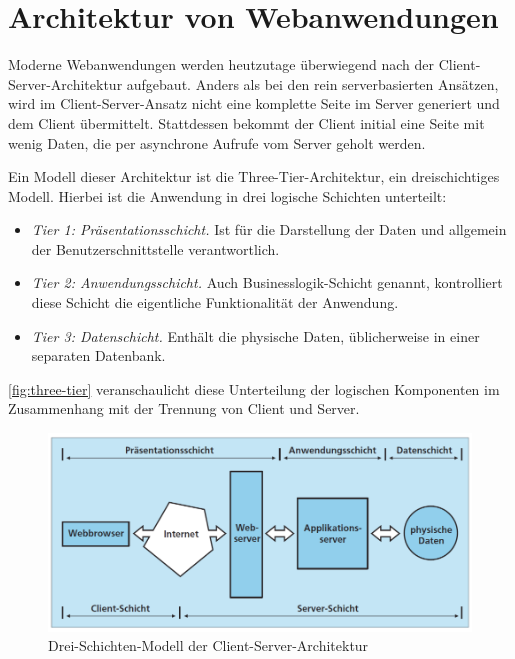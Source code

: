 \section{Architektur von Webanwendungen}
Moderne Webanwendungen werden heutzutage überwiegend nach der Client-Server-Architektur aufgebaut. Anders als bei den rein serverbasierten Ansätzen, wird im Client-Server-Ansatz nicht eine komplette Seite im Server generiert und dem Client übermittelt. Stattdessen bekommt der Client initial eine Seite mit wenig Daten, die per asynchrone Aufrufe vom Server geholt werden\cite{Saternos2014}.

Ein Modell dieser Architektur ist die Three-Tier-Architektur, ein dreischichtiges Modell. Hierbei ist die Anwendung in drei logische Schichten unterteilt\cite{Techopedia2017}:
\begin{itemize}
	\item \textit{Tier 1: Präsentationsschicht.} Ist für die Darstellung der Daten und allgemein der Benutzerschnittstelle verantwortlich.
	\item \textit{Tier 2: Anwendungsschicht.} Auch Businesslogik-Schicht genannt, kontrolliert diese Schicht die eigentliche Funktionalität der Anwendung.
	\item \textit{Tier 3: Datenschicht.} Enthält die physische Daten, üblicherweise in einer separaten Datenbank.
\end{itemize}

\autoref{fig:three-tier} veranschaulicht diese Unterteilung der logischen Komponenten im Zusammenhang mit der Trennung von Client und Server.

\begin{figure}[ht!]
	\centering
	\includegraphics[width=\linewidth]{bilder/kap2/three-tier}
	\caption{Drei-Schichten-Modell der Client-Server-Architektur\cite{Conallen2000}}
	\label{fig:three-tier}
\end{figure}

